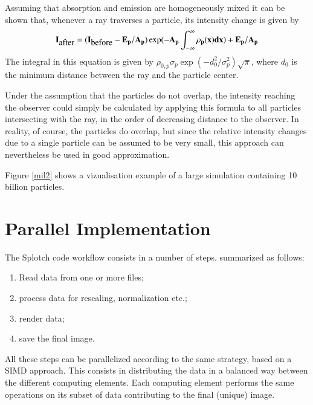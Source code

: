 Assuming that absorption and emission are homogeneously mixed it
can be shown that, whenever a ray traverses a particle, its intensity
change is given by
\begin{equation}
\label{i_change}
\bf{I}_{\mbox{after}}=(\bf{I}_{\mbox{before}}-\bf{E}_p/\bf{A}_p)
\exp(-\bf{A}_p\int_{-\infty}^\infty\rho_p(x)dx) + \bf{E}_p/\bf{A}_p
\end{equation}
The integral in this equation is given by
$\rho_{0,p}\sigma_p\exp{(-d_0^2/\sigma_p^2)}\sqrt{\pi}$, where $d_0$
is the minimum distance between the ray and the particle center.

Under the assumption that the particles do not overlap, the intensity
reaching the observer could simply be calculated by applying this formula to
all particles intersecting with the ray, in the order of decreasing distance
to the observer. In reality, of course, the particles do overlap, but since
the relative intensity changes due to a single particle can be assumed to be
very small, this approach can nevertheless be used in good approximation.

Figure \ref{mil2} shows a vizualisation example of a large simulation 
containing 10 billion particles.

\section{Parallel Implementation}
\label{parallel}

The Splotch code workflow consists in a number of steps,
summarized as follows:
\begin{enumerate}
\item Read data from one or more files;
\item process data for rescaling, normalization etc.;
\item render data;
\item save the final image.
\end{enumerate}
All these steps can be parallelized according to the same strategy, based on a SIMD approach. 
This consists in 
distributing the data in a balanced way between the different computing elements.
Each computing element performs the same operations on its subset of data contributing 
to the final (unique) image. 

